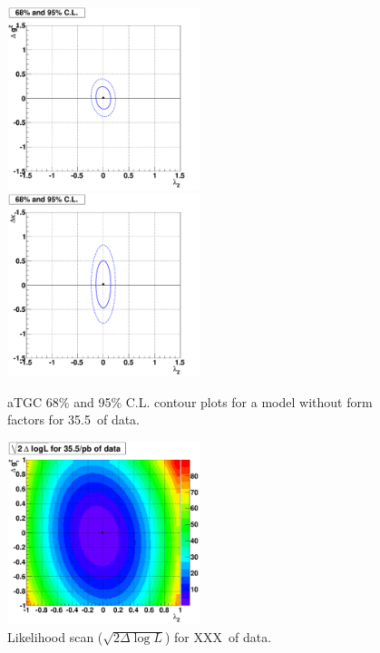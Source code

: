 \begin{figure}[tp]
  \centerline{
    \includegraphics[width=0.5\textwidth]{figures/lz_dkz_contourplot2}
    \includegraphics[width=0.5\textwidth]{figures/lz_dkg_contourplot2}
  }

  \caption[Contour plots for data] {aTGC 68\% and 95\% C.L. contour
    plots for a model without form factors for 35.5\ipb\ of data.}
  \label{fig:contour}
\end{figure}

\begin{figure}[tp]
  \centerline{
    \includegraphics[width=0.5\textwidth]{figures/lz_dkz_likelihood.pdf}
  }

  \caption[Likelihood scan] {Likelihood scan ($\sqrt{2\Delta\log L}$)
    for XXX\ipb\ of  data. }
  \label{ref:likelihood}
\end{figure}
